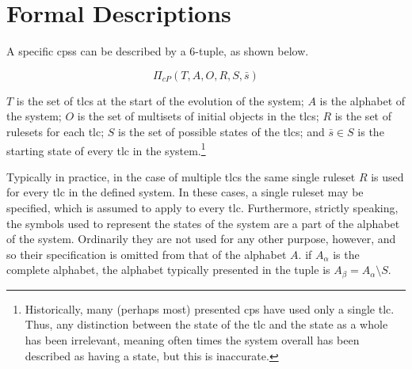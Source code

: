 \section{\label{sec:cps:formaldescriptions}Formal  Descriptions}

A specific \glspl{cps} can be described by a 6-tuple, as shown below.

\[
\Pi_{cP}(T, A, O, R, S, \bar{s})
\]

\(T\) is the set of \glspl{tlc} at the start of the evolution of the system; \(A\) is the alphabet of the system; \(O\) is the set of multisets of initial objects in the \glspl{tlc}; \(R\) is the set of \glspl{ruleset} for each \gls{tlc}; \(S\) is the set of possible states of the \glspl{tlc}; and \(\bar{s} \in S\) is the starting state of every \gls{tlc} in the system.\footnote{Historically, many (perhaps most) presented \gls{cps} have used only a single \gls{tlc}.  Thus, any distinction between the state of the \gls{tlc} and the state as a whole has been irrelevant, meaning often times the system overall has been described as having a state, but this is inaccurate.}

Typically in practice, in the case of multiple \glspl{tlc} the same single ruleset \(R\) is used for every \gls{tlc} in the defined system.  In these cases, a single ruleset may be specified, which is assumed to apply to every \gls{tlc}.  Furthermore, strictly speaking, the symbols used to represent the states of the system are a part of the alphabet of the system.  Ordinarily they are not used for any other purpose, however, and so their specification is omitted from that of the alphabet \(A\).  \Ie{} if \(A_\alpha\) is the complete alphabet, the alphabet typically presented in the tuple is \( A_\beta = A_\alpha \setminus S \).